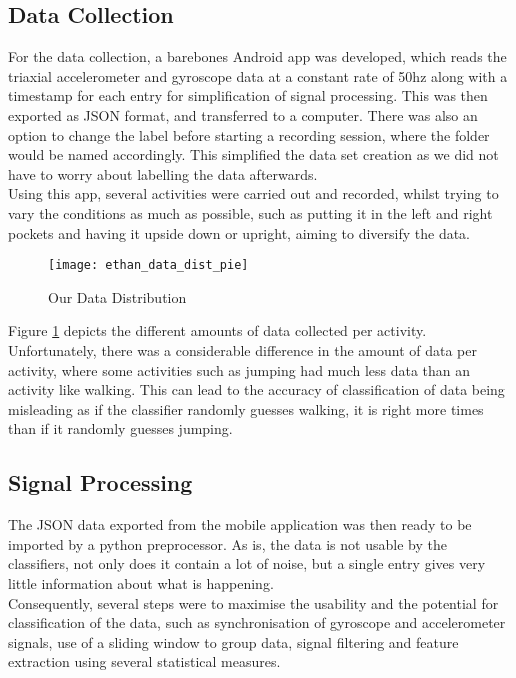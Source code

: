 \subsection{Data Collection}
For the data collection, a barebones Android app was developed, which reads the triaxial accelerometer and gyroscope data at a constant rate of 50hz along with a timestamp for each entry 
for simplification of signal processing. This was then exported as JSON format, and transferred to a computer. There was also an option to change the label before 
starting a recording session, where the folder would be named accordingly. This simplified the data set creation as we did not have to worry about labelling the data 
afterwards.\\
Using this app, several activities were carried out and recorded, whilst trying to vary the conditions as much as possible, such as putting it in the left and right pockets and having it upside down or upright, aiming to diversify the data.  
\begin{figure}[htp]
    \centering
    \texttt{[image: ethan\_data\_dist\_pie]}
    \caption{Our Data Distribution}
    \label{our_data_count_dist}
    \end{figure}

Figure \ref{our_data_count_dist} depicts the different amounts of data collected per activity. Unfortunately, there was a considerable difference in the amount of data per activity, where some activities such as jumping had much less data than an activity like walking. This can lead to the accuracy of classification of data being misleading as if the classifier randomly guesses walking, it is right more times than if it randomly guesses jumping. 

\subsection{Signal Processing}
The JSON data exported from the mobile application was then ready to be imported by a python preprocessor. As is, the data is not usable by the classifiers, not only does it contain a lot of noise, but a single entry gives very little information about what is happening.\\
Consequently, several steps were to maximise the usability and the potential for classification of the data, such as synchronisation of gyroscope and accelerometer signals, use of a sliding window to group data, signal filtering and feature extraction using several statistical measures.   

